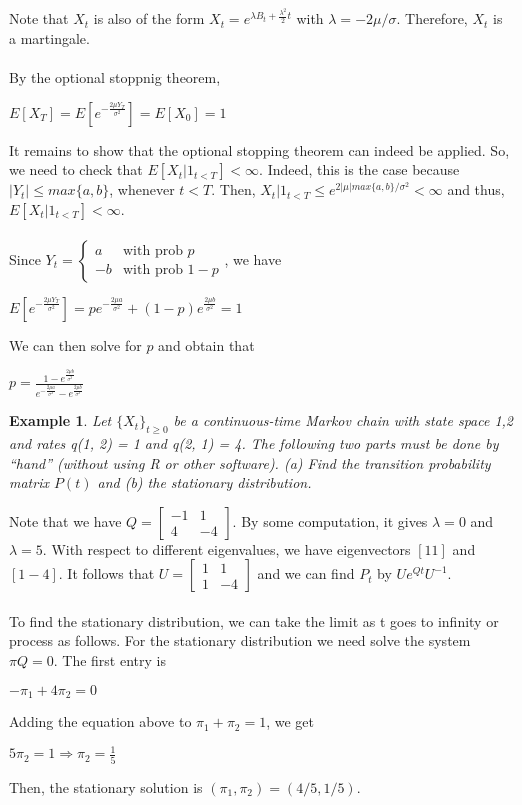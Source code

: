 \documentclass[12pt]{article}
\newtheorem{example}{Example}
\begin{document}
\noindent Note that $X_t$ is also of the form $X_t = e^{\lambda B_t + \frac{\lambda ^2}{2}t}$ with $\lambda = -2\mu / \sigma$. Therefore, $X_t$ is a martingale.
\\
\\By the optional stoppnig theorem,
\begin{center}
    $E[X_T] = E[e^{-\frac{2\mu Y_T}{\sigma^2}}] = E[X_0] = 1$
\end{center}
\noindent It remains to show that the optional stopping theorem can indeed be applied. So, we need to check that $E[X_t | 1_{t < T}] < \infty $. Indeed, this is the case because $|Y_t| \leq max\{a,b\}$, whenever $t < T$. Then, $X_t | 1_{t < T} \leq e^{2|\mu|max\{a,b\}/\sigma^2} < \infty$ and thus, $E[X_t | 1_{t < T}] < \infty$.
\\
\\ Since $Y_t = \left\{\begin{matrix}
 a & \text{with prob }p  \\
 -b & \text{with prob } 1-p
\end{matrix}\right.$, we have
\begin{center}
    $E[e^{-\frac{2\mu Y_T}{\sigma^2}}] = pe^{-\frac{2\mu a}{\sigma^2}} + (1-p)e^{\frac{2\mu b}{\sigma^2}} = 1$
\end{center}
\noindent We can then solve for $p$ and obtain that
\begin{center}
    $p = \frac{1-e^\frac{2\mu b}{\sigma^2}}{e^{-\frac{2\mu a}{\sigma^2}} - e^{\frac{2\mu b}{\sigma^2}}}$
\end{center}

\begin{example}
    Let $\{X_t\}_{t \geq 0}$ be a continuous-time Markov chain with state space {1,2} and rates q(1, 2) = 1 and q(2, 1) = 4. The following two parts must be done by “hand” (without using R or other software). (a) Find the transition probability matrix $P(t)$ and (b) the stationary distribution.
\end{example}

Note that we have $Q = \begin{bmatrix}
 -1 & 1\\
 4 & -4
\end{bmatrix}$. By some computation, it gives $\lambda = 0$ and $\lambda = 5$. With respect to different eigenvalues, we have eigenvectors $[1 1]$ and $[1 -4]$. It follows that $U = \begin{bmatrix}
 1 & 1\\
 1 & -4
\end{bmatrix}$ and we can find $P_t$ by $Ue^{Qt}U^{-1}$.
\\
\\To find the stationary distribution, we can take the limit as t goes to infinity or process as follows. For the stationary distribution we need solve the system $\pi Q = 0$. The first entry is
\begin{center}
    $-\pi_1 + 4\pi_2 = 0$
\end{center}
Adding the equation above to $\pi_1 + \pi_2 = 1$, we get
\begin{center}
    $5\pi_2 = 1 \Rightarrow \pi_2 = \frac{1}{5}$
\end{center}
Then, the stationary solution is $(\pi_1, \pi_2) = (4/5, 1/5)$.
\end{document}
